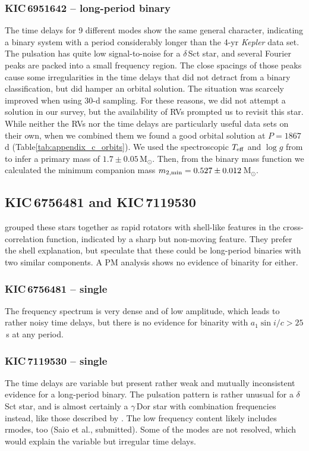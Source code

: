 \documentclass[a4paper,fleqn,usenatbib]{mnras}
\begin{document}
\subsubsection{KIC\,6951642 -- long-period binary}
The time delays for 9 different modes show the same general character, indicating a binary system with a period considerably longer than the 4-yr \textit{Kepler} data set. The pulsation has quite low signal-to-noise for a $\delta$\,Sct star, and several Fourier peaks are packed into a small frequency region. The close spacings of those peaks cause some irregularities in the time delays that did not detract from a binary classification, but did hamper an orbital solution. The situation was scarcely improved when using 30-d sampling. For these reasons, we did not attempt a solution in our survey, but the availability of RVs prompted us to revisit this star. While neither the RVs nor the time delays are particularly useful data sets on their own, when we combined them we found a good orbital solution at $P=1867$\,d (Table\:\ref{tab:appendix_c_orbits}). We used the spectroscopic $T_{\rm eff}$ and $\log g$ from \citet{niemczuraetal2015} to infer a primary mass of $1.7\pm0.05$\,M$_{\odot}$. Then, from the binary mass function we calculated the minimum companion mass $m_{\rm 2,min} = 0.527\pm0.012$\,M$_{\odot}$.


\subsection{KIC\,6756481 and KIC\,7119530}
\citeauthor{lampensetal2017} grouped these stars together as rapid rotators with shell-like features in the cross-correlation function, indicated by a sharp but non-moving feature. They prefer the shell explanation, but speculate that these could be long-period binaries with two similar components. A PM analysis shows no evidence of binarity for either.
\subsubsection{KIC\,6756481 -- single}
The frequency spectrum is very dense and of low amplitude, which leads to rather noisy time delays, but there is no evidence for binarity with $a_1 \sin i / c > 25$\,s at any period.
\subsubsection{KIC\,7119530 -- single}
The time delays are variable but present rather weak and mutually inconsistent evidence for a long-period binary. The pulsation pattern is rather unusual for a $\delta$\,Sct star, and is almost certainly a $\gamma$\,Dor star with combination frequencies instead, like those described by \citet{kurtzetal2015}. The low frequency content likely includes r\:modes, too (Saio et al., submitted). Some of the modes are not resolved, which would explain the variable but irregular time delays.
\end{document}
